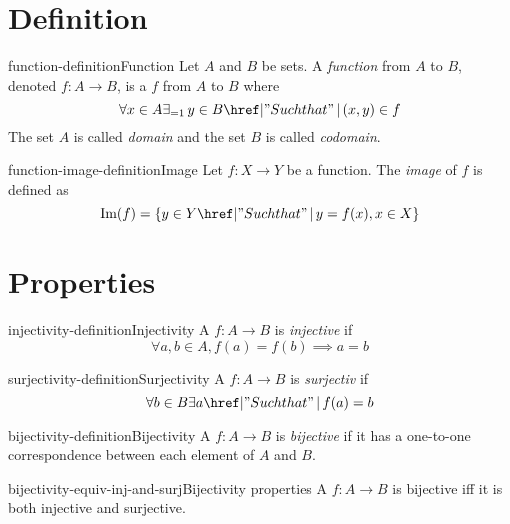 \documentclass[preview]{standalone}
\begin{document}
\genpage

\section{Definition}

\begin{snippetdefinition}{function-definition}{Function}
    Let \(A\) and \(B\) be sets.
    A \textit{function} from \(A\) to \(B\), denoted \(f\colon A\to B\),
    is a \binrelation \(f\) from \(A\) to \(B\) where
    \[
        \forall x \in A \exists_{=1} \, y \in B \suchthat (x,y) \in f
    \]
    The set \(A\) is called \textit{domain} and the set \(B\) is called \textit{codomain}.
\end{snippetdefinition}

\begin{snippetdefinition}{function-image-definition}{Image}
    Let \(f\colon X\to Y\) be a function.
    The \textit{image} of \(f\) is defined as
    \[ \text{Im}(f) = \{y \in Y \suchthat y=f(x), x \in X \} \]
\end{snippetdefinition}

\section{Properties}

\begin{snippetdefinition}{injectivity-definition}{Injectivity}
    A \function \(f \colon A\to B\) is \textit{injective} if
    \[
        \forall a,b \in A, f(a) = f(b) \implies a = b
    \]
\end{snippetdefinition}

\begin{snippetdefinition}{surjectivity-definition}{Surjectivity}
    A \function \(f \colon A\to B\) is \textit{surjectiv} if
    \[
        \forall b \in B \exists a \suchthat f(a)=b
    \]
\end{snippetdefinition}

\begin{snippetdefinition}{bijectivity-definition}{Bijectivity}
    A \function \(f \colon A\to B\) is \textit{bijective} if
    it has a one-to-one correspondence between each element of \(A\) and  \(B\).
\end{snippetdefinition}

\begin{snippetcorollary}{bijectivity-equiv-inj-and-surj}{Bijectivity properties}
    A \function \(f \colon A\to B\) is bijective iff it is both injective and surjective.
\end{snippetcorollary}
\end{document}
